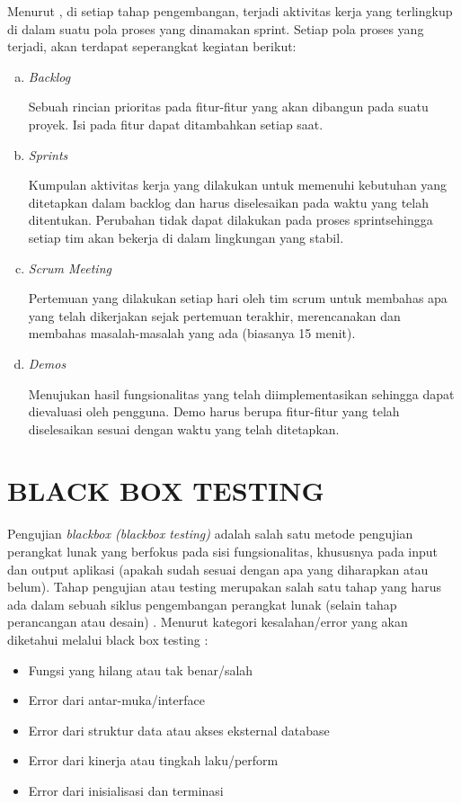 \par Menurut \cite{pressman2010}, di setiap tahap pengembangan, terjadi aktivitas kerja yang terlingkup di dalam suatu pola proses yang dinamakan sprint. Setiap pola proses yang terjadi, akan terdapat seperangkat kegiatan berikut: 

\begin{enumerate}[a.]
\item \textit{Backlog}
 \par Sebuah rincian prioritas pada fitur-fitur yang akan dibangun pada suatu proyek. Isi pada fitur dapat ditambahkan setiap saat. 
 \item \textit{Sprints} 
 \par Kumpulan aktivitas kerja yang dilakukan untuk memenuhi kebutuhan yang ditetapkan dalam backlog dan harus diselesaikan pada waktu yang telah ditentukan. Perubahan tidak dapat dilakukan pada proses sprintsehingga setiap tim akan bekerja di dalam lingkungan yang stabil. 
 \item \textit{Scrum Meeting} 
 \par Pertemuan yang dilakukan setiap hari oleh tim scrum untuk membahas apa yang telah dikerjakan sejak pertemuan terakhir, merencanakan dan membahas masalah-masalah yang ada (biasanya 15 menit).
 \item \textit{Demos} 
 \par Menujukan hasil fungsionalitas yang telah diimplementasikan sehingga dapat dievaluasi oleh pengguna. 
 Demo harus berupa fitur-fitur yang telah diselesaikan sesuai dengan waktu yang telah ditetapkan. 
\end{enumerate}

\section{\uppercase{Black Box Testing}}
Pengujian \textit{blackbox (blackbox testing)} adalah salah satu metode pengujian perangkat lunak yang berfokus pada sisi fungsionalitas, khususnya pada input dan output aplikasi (apakah sudah sesuai dengan apa yang diharapkan atau belum). Tahap pengujian atau testing merupakan salah satu tahap yang harus ada dalam sebuah siklus pengembangan perangkat lunak (selain tahap perancangan atau desain) \citep{iskandaria2012}. Menurut \cite{shihab2011} kategori kesalahan/error yang akan diketahui melalui black box testing :

\begin{itemize}
\item Fungsi yang hilang atau tak benar/salah
\item Error dari antar-muka/interface
\item Error dari struktur data atau akses eksternal database
\item Error dari kinerja atau tingkah laku/perform
\item Error dari inisialisasi dan terminasi
\end{itemize}


